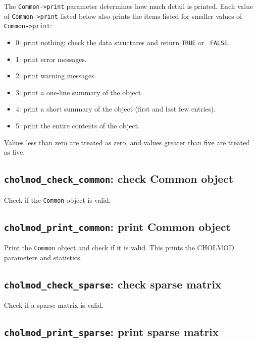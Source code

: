 \documentclass[11pt]{article}
\begin{document}
The {\tt Common->print} parameter determines how much detail is printed.  Each
value of {\tt Common->print} listed below also prints the items listed for
smaller values of {\tt Common->print}:

\begin{itemize}
\item 0: print nothing; check the data structures and return {\tt TRUE} or {\tt
FALSE}.
\item 1: print error messages.
\item 2: print warning messages.
\item 3: print a one-line summary of the object.
\item 4: print a short summary of the object (first and last few entries).
\item 5: print the entire contents of the object.
\end{itemize}
Values less than zero are treated as zero, and values greater than five are
treated as five.

\subsection{{\tt cholmod\_check\_common}: check Common object}


Check if the {\tt Common} object is valid.

\subsection{{\tt cholmod\_print\_common}: print Common object}


Print the {\tt Common} object and check if it is valid.
This prints the CHOLMOD parameters and statistics.

\subsection{{\tt cholmod\_check\_sparse}: check sparse matrix}


Check if a sparse matrix is valid.

\subsection{{\tt cholmod\_print\_sparse}: print sparse matrix}
\end{document}
